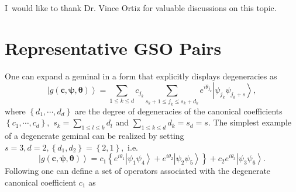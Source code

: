 \documentclass[aps,preprint]{revtex4}%
\begin{document}
I\ would like to thank Dr. Vince Ortiz for valuable discussions on this topic.

\appendix


\section{Representative GSO Pairs\label{GSOpairs}}

One can expand a geminal in a form that explicitly displays degeneracies as
\begin{equation}
\left\vert g\left(  \boldsymbol{c},\boldsymbol{\psi},\boldsymbol{\theta
}\right)  \right\rangle =\sum_{1\leq k\leq d}c_{j_{k}}\sum_{s_{k}+1\leq
j_{k}\leq s_{k}+d_{k}}e^{i\theta_{j_{k}}}\left\vert \psi_{j_{k}}\psi_{j_{k}%
+s}\right\rangle ,
\end{equation}
where $\left\{  d_{1},\cdots,d_{d}\right\}  $ are the degree of degeneracies
of the canonical coefficients $\left\{  c_{1},\cdots,c_{d}\right\}  ,$
$s_{k}=\sum\limits_{1\leq l\leq k}d_{l}$ and $\sum\limits_{1\leq k\leq d}%
d_{k}=s_{d}=s.$ The simplest example of a degenerate geminal can be realized
by setting $s=3,d=2,\left\{  d_{1},d_{2}\right\}  =\left\{  2,1\right\}  ,$
i.e.
\begin{equation}
\left\vert g\left(  \boldsymbol{c},\boldsymbol{\psi},\boldsymbol{\theta
}\right)  \right\rangle =c_{1}\left\{  e^{i\theta_{1}}\left\vert \psi_{1}%
\psi_{4}\right\rangle +e^{i\theta_{2}}\left\vert \psi_{2}\psi_{5}\right\rangle
\right\}  +c_{2}e^{i\theta_{3}}\left\vert \psi_{3}\psi_{6}\right\rangle .
\end{equation}
Following \cite{OrtizWeiner2006,Weiner83a,AGPCoherent} one can define a set of
operators associated with the degenerate canonical coefficient $c_{1}$ as%
\end{document}
